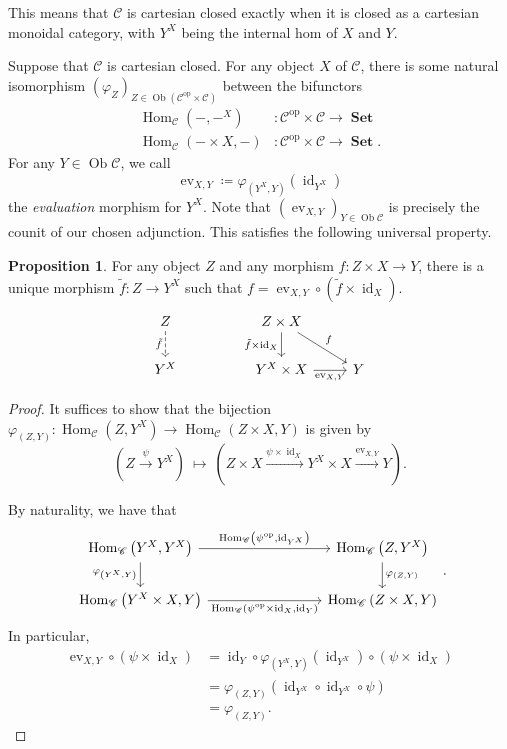 \documentclass[10pt,letterpaper,cm]{nupset}
\theoremstyle{definition}
\theoremstyle{theorem}
\newtheorem{prop}[definition]{Proposition}
\theoremstyle{remark}
\DeclareMathOperator{\ob}{Ob}
\DeclareMathOperator{\ev}{ev}
\newcommand{\0}{\mathbf{0}}
\newcommand{\1}{\mathbf{1}}
\newcommand{\2}{\mathbf{2}}
\DeclareMathOperator{\op}{op}
\DeclareMathOperator{\set}{\mathbf{Set}}
\renewcommand{\c}{\mathscr{C}}
\DeclareMathOperator{\Hom}{Hom}
\DeclareMathOperator{\idd}{id}
\begin{document}
This means that  $\c$ is cartesian closed exactly when it  is closed as a cartesian monoidal category, with $Y^X$ being the internal hom of $X$ and $Y$.

\medskip

Suppose that $\c$ is cartesian closed. For any object $X$ of $\c$, there is some natural isomorphism $\left(\varphi_{Z}\right)_{Z\in \ob\left(\c^{\op} \times \c\right)}$ between the bifunctors 
\begin{align*}
\Hom_{\c}\left({-}, {-}^X\right) &: \c^{\op} \times \c  \to \set
\\ \Hom_{\c}\left({-}\times X, {-}\right) &: \c^{\op} \times \c  \to \set.
\end{align*}   For any $Y \in \ob{\c}$, we call $$\ev_{X, Y} \coloneqq \varphi_{\left(Y^X, Y\right)}\left(\idd_{Y^X}\right)$$ the \textit{evaluation} morphism for $Y^X$. Note that $\left(\ev_{X, Y}\right)_{Y \in \ob{\c}}$ is precisely the counit of our chosen adjunction. This satisfies the following universal property.


\begin{prop}
For any object $Z$ and any morphism $f: Z \times X \to Y$, there is a unique morphism $\tilde{f} :Z \to Y^X$ such that $ f= \ev_{X,Y} \circ \left(\tilde{f} \times \idd_X\right)$.
\[
\begin{tikzcd}
Z \arrow[d, "\tilde{f}"', dashed] &  & Z \times X \arrow[d, "\tilde{f} \times \idd_X"'] \arrow[rd, "f"] &   \\
Y^X                                &  & Y^X \times X \arrow[r, "{\ev_{X,Y}}"']                           & Y
\end{tikzcd}
\]

\end{prop}
\begin{proof}
It suffices to show that the bijection $ \varphi_{(Z, Y)} : \Hom_{\c}({Z}, Y^X) \to \Hom_{\c}(Z\times X, {Y})$ is given by
\[
\left(Z \overset{\psi}{\longrightarrow} Y^X\right) \ \mapsto \  \left(Z \times X \xrightarrow{\psi \times \idd_X } Y^X \times X \xrightarrow{\ev_{X,Y} } Y\right)
.\] 

By naturality, we have that
\[
\begin{tikzcd}[column sep =19ex]
{\Hom_{\c}\left(Y^X, Y^X\right)} \arrow[d, "{\varphi_{\left(Y^X, Y\right)}}"'] \arrow[r, "{\Hom_{\c}\left(\psi^{\op} , \idd_{Y^X}\right)}"] & {\Hom_{\c}\left(Z, Y^X\right)} \arrow[d, "{\varphi_{\left(Z, Y\right)}}"] \\
{\Hom_{\c}\left(Y^X \times X, Y\right)} \arrow[r, "{\Hom_{\c}\left(\psi^{\op} \times \idd_X, \idd_Y\right)}"']                    & {\Hom_{\c}\left(Z \times X, Y\right)}                         
\end{tikzcd}
.\]
In particular,
\begin{align*}
\ev_{X, Y} \circ \left(\psi \times \idd_X\right) & = \idd_Y \circ \varphi_{\left(Y^X, Y\right)}\left(\idd_{Y^X}\right) \circ \left(\psi \times \idd_X\right)
\\ & = \varphi_{\left(Z,Y\right)}\left(\idd_{Y^X} \circ \idd_{Y^X} \circ \psi\right) 
\\ &= \varphi_{\left(Z,Y\right)}
.
\end{align*}
\end{proof}
\end{document}
